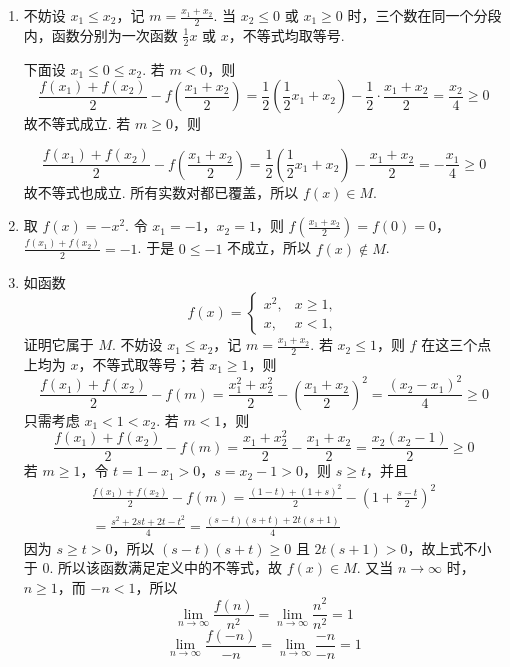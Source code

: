 \begin{solution}
\begin{enumerate}
\item 不妨设 \(x_1\le x_2\)，记 \(m=\frac{x_1+x_2}{2}\). 当 \(x_2\le0\) 或 \(x_1\ge0\) 时，三个数在同一个分段内，函数分别为一次函数 \(\frac12x\) 或 \(x\)，不等式均取等号.

下面设 \(x_1\le0\le x_2\). 若 \(m<0\)，则
\[
\frac{f(x_1)+f(x_2)}{2}-f\left(\frac{x_1+x_2}{2}\right)
=\frac{1}{2}\left(\frac{1}{2}x_1+x_2\right)-\frac{1}{2}\cdot\frac{x_1+x_2}{2}
=\frac{x_2}{4}\ge0
\]
故不等式成立. 若 \(m\ge0\)，则

\[
\frac{f(x_1)+f(x_2)}{2}-f\left(\frac{x_1+x_2}{2}\right)
=\frac{1}{2}\left(\frac{1}{2}x_1+x_2\right)-\frac{x_1+x_2}{2}
=-\frac{x_1}{4}\ge0
\]
故不等式也成立. 所有实数对都已覆盖，所以 \(f(x)\in M\).

\item 取 \(f(x)=-x^2\). 令 \(x_1=-1\)，\(x_2=1\)，则
\(f\left(\frac{x_1+x_2}{2}\right)=f(0)=0\)，\(\frac{f(x_1)+f(x_2)}{2}=-1\).
于是 \(0\le-1\) 不成立，所以 \(f(x)\notin M\).

\item 如函数
\[
f(x)=\begin{cases}
x^2,& x\ge1,\\
x,& x<1,
\end{cases}
\]
证明它属于 \(M\). 不妨设 \(x_1\le x_2\)，记 \(m=\frac{x_1+x_2}{2}\). 若 \(x_2\le1\)，则 \(f\) 在这三个点上均为 \(x\)，不等式取等号；若 \(x_1\ge1\)，则
\[
\frac{f(x_1)+f(x_2)}{2}-f(m)
 =\frac{x_1^2+x_2^2}{2}-\left(\frac{x_1+x_2}{2}\right)^2
 =\frac{(x_2-x_1)^2}{4}\ge0
\]
只需考虑 \(x_1<1<x_2\). 若 \(m<1\)，则
\[
\frac{f(x_1)+f(x_2)}{2}-f(m)
 =\frac{x_1+x_2^2}{2}-\frac{x_1+x_2}{2}
 =\frac{x_2(x_2-1)}{2}\ge0
\]
若 \(m\ge1\)，令 \(t=1-x_1>0\)，\(s=x_2-1>0\)，则 \(s\ge t\)，并且
\[
\begin{gathered}
\frac{f(x_1)+f(x_2)}{2}-f(m)
=\frac{(1-t)+(1+s)^2}{2}-\left(1+\frac{s-t}{2}\right)^2
\\
=\frac{s^2+2st+2t-t^2}{4}
=\frac{(s-t)(s+t)+2t(s+1)}{4}
\end{gathered}
\]
因为 \(s\ge t>0\)，所以 \((s-t)(s+t)\ge0\) 且 \(2t(s+1)>0\)，故上式不小于 \(0\).
所以该函数满足定义中的不等式，故 \(f(x)\in M\). 又当 \(n\to\infty\) 时，\(n\ge1\)，而 \(-n<1\)，所以
\[
\lim_{n\to\infty}\frac{f(n)}{n^2}
=\lim_{n\to\infty}\frac{n^2}{n^2}=1
\]
\[
\lim_{n\to\infty}\frac{f(-n)}{-n}
 =\lim_{n\to\infty}\frac{-n}{-n}=1
\]
\end{enumerate}
\end{solution}

